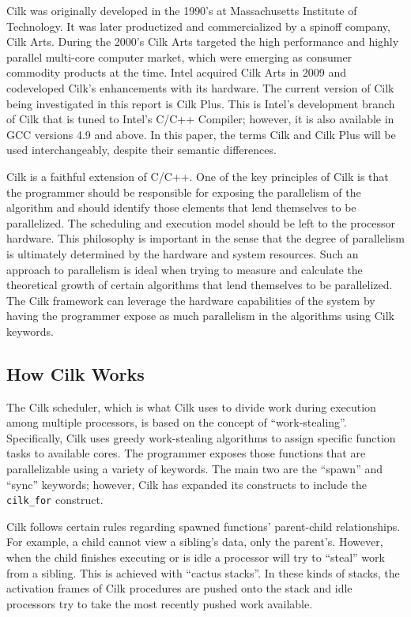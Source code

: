 
Cilk was originally developed in the 1990’s at Massachusetts Institute of Technology. It was
later productized and commercialized by a spinoff company, Cilk Arts. During the 2000’s Cilk
Arts targeted the high performance and highly parallel multi-core computer market, which were emerging as consumer commodity products at the time. Intel acquired Cilk Arts in 2009 and codeveloped Cilk’s enhancements with its hardware. The current version of Cilk being investigated in this report is Cilk Plus. This is Intel’s development branch of Cilk that is tuned to Intel’s C/C++ Compiler; however, it is also available in GCC versions 4.9 and above. In this
paper, the terms Cilk and Cilk Plus will be used interchangeably, despite their semantic
differences.

Cilk is a faithful extension of C/C++. One of the key principles of Cilk is that the
programmer should be responsible for exposing the parallelism of the algorithm and should
identify those elements that lend themselves to be parallelized. The scheduling and execution
model should be left to the processor hardware. This philosophy is important in the sense that the degree of parallelism is ultimately determined by the hardware and system resources. Such an approach to parallelism is ideal when trying to measure and calculate the theoretical growth of certain algorithms that lend themselves to be parallelized. The Cilk framework can leverage the hardware capabilities of the system by having the programmer expose as much parallelism in the algorithms using Cilk keywords.


\subsection{How Cilk Works}
The Cilk scheduler, which is what Cilk uses to divide work during execution among multiple processors, is based on the concept of “work-stealing”. Specifically, Cilk uses greedy work-stealing algorithms to assign specific function tasks to available cores. The programmer exposes those functions that are parallelizable using a variety of keywords. The main two are the “spawn” and “sync” keywords; however, Cilk has expanded its constructs to include the \texttt{cilk\_for} construct.

Cilk follows certain rules regarding spawned functions’ parent-child relationships. For example, a child cannot view a sibling’s data, only the parent’s. However, when the child finishes executing or is idle a processor will try to “steal” work from a sibling. This is achieved with “cactus stacks”. In these kinds of stacks, the activation frames of Cilk procedures are pushed onto the stack and idle processors try to take the most recently pushed work available.

